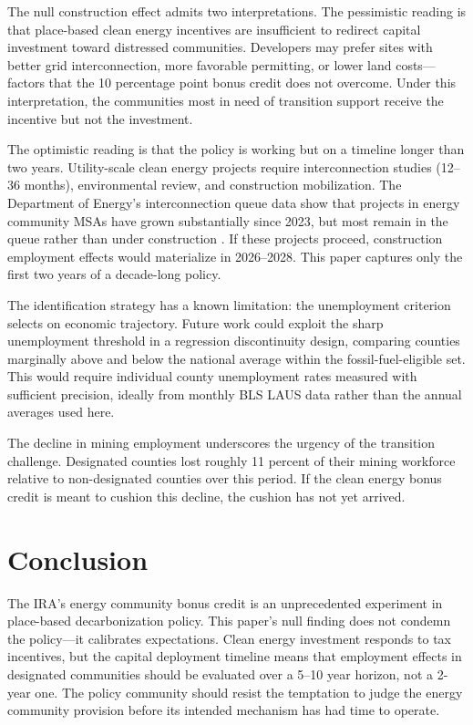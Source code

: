 \documentclass[12pt]{article}
\begin{document}
The null construction effect admits two interpretations. The pessimistic reading is that place-based clean energy incentives are insufficient to redirect capital investment toward distressed communities. Developers may prefer sites with better grid interconnection, more favorable permitting, or lower land costs---factors that the 10 percentage point bonus credit does not overcome. Under this interpretation, the communities most in need of transition support receive the incentive but not the investment.

The optimistic reading is that the policy is working but on a timeline longer than two years. Utility-scale clean energy projects require interconnection studies (12--36 months), environmental review, and construction mobilization. The Department of Energy's interconnection queue data show that projects in energy community MSAs have grown substantially since 2023, but most remain in the queue rather than under construction \citep{DOE2023}. If these projects proceed, construction employment effects would materialize in 2026--2028. This paper captures only the first two years of a decade-long policy.

The identification strategy has a known limitation: the unemployment criterion selects on economic trajectory. Future work could exploit the sharp unemployment threshold in a regression discontinuity design, comparing counties marginally above and below the national average within the fossil-fuel-eligible set. This would require individual county unemployment rates measured with sufficient precision, ideally from monthly BLS LAUS data rather than the annual averages used here.

The decline in mining employment underscores the urgency of the transition challenge. Designated counties lost roughly 11 percent of their mining workforce relative to non-designated counties over this period. If the clean energy bonus credit is meant to cushion this decline, the cushion has not yet arrived.


\section{Conclusion}
\label{sec:conclusion}

The IRA's energy community bonus credit is an unprecedented experiment in place-based decarbonization policy. This paper's null finding does not condemn the policy---it calibrates expectations. Clean energy investment responds to tax incentives, but the capital deployment timeline means that employment effects in designated communities should be evaluated over a 5--10 year horizon, not a 2-year one. The policy community should resist the temptation to judge the energy community provision before its intended mechanism has had time to operate.
\end{document}
